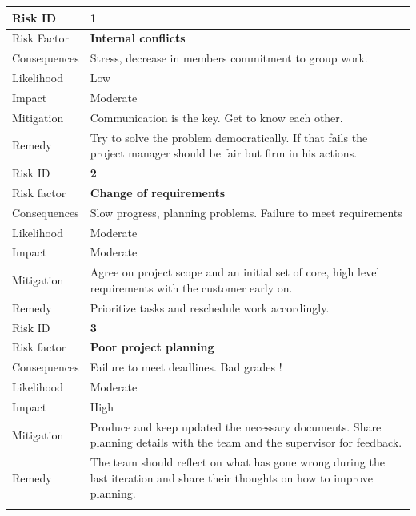 \newpage

\begin{table}[h]
\begin{tabular}{ | l | p{11.5cm} | }

  \hline
  Risk ID & \textbf{1} \\
  \hline\noalign{\smallskip}\hline
  Risk Factor   & \textbf{Internal conflicts} \\
  Consequences  & Stress, decrease in members commitment to group work.\\
  Likelihood    & Low \\
  Impact        & Moderate \\
  Mitigation    & Communication is the key. Get to know each other. \\
  Remedy        & Try to solve the problem democratically. \newline
                If that fails the project manager should be fair but firm in his actions. \\
  \hline\noalign{\smallskip}\noalign{\smallskip}\hline
  
  
  Risk ID & \textbf{2} \\
  \hline\noalign{\smallskip}\hline
  Risk factor   & \textbf{Change of requirements} \\
  Consequences  & Slow progress, planning problems. Failure to meet requirements \\
  Likelihood    & Moderate \\
  Impact        & Moderate \\
  Mitigation    & Agree on project scope and an initial set of core, high level requirements with the customer early on. \\
  Remedy        & Prioritize tasks and reschedule work accordingly. \\
  \hline\noalign{\smallskip}\noalign{\smallskip}\hline

  Risk ID & \textbf{3} \\
  \hline\noalign{\smallskip}\hline
  Risk factor   & \textbf{Poor project planning} \\
  Consequences  & Failure to meet deadlines. Bad grades !\\
  Likelihood    & Moderate \\
  Impact        & High \\
  Mitigation    & Produce and keep updated the necessary documents.
                Share planning details with the team and the supervisor for feedback. \\
  Remedy        & The team should reflect on what has gone wrong during the last iteration and
                share their thoughts on how to improve planning. \\
  \hline\noalign{\smallskip}\noalign{\smallskip}\hline


\end{tabular}
\end{table}
